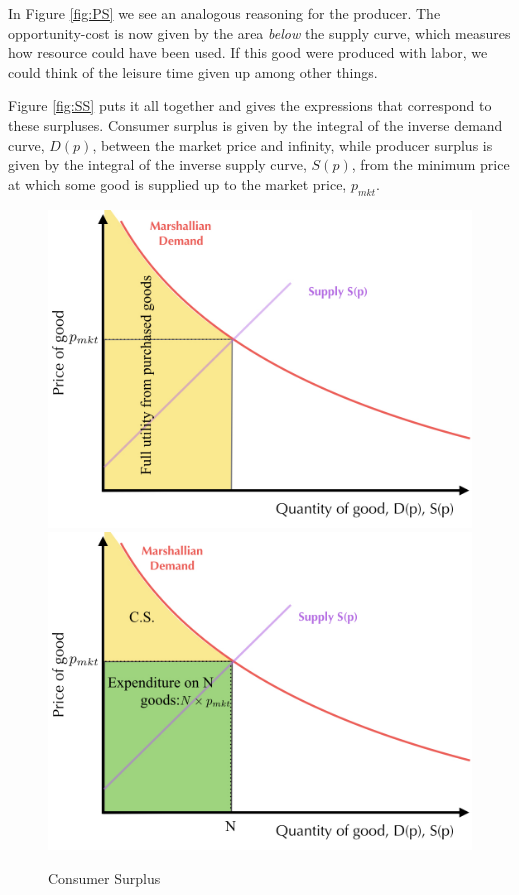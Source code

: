 \documentclass[11pt,english]{article}
\begin{document}
In Figure \ref{fig:PS} we see an analogous reasoning for the producer. The opportunity-cost is now given by the area \emph{below} the supply curve, which measures how resource could have been used. If this good were produced with labor, we could think of the leisure time given up among other things.

Figure \ref{fig:SS} puts it all together and gives the expressions that correspond to these surpluses. Consumer surplus is given by the integral of the inverse demand curve, $D(p)$, between the market price and infinity, while producer surplus is given by the integral of the inverse supply curve, $S(p)$, from the minimum price at which some good is supplied up to the market price, $p_{mkt}$.

\begin{figure}[htpb!]
	\centering
	\includegraphics[width=0.5\linewidth]{Figures/CS1}\includegraphics[width=0.5\linewidth]{Figures/CS2}
	\caption{Consumer Surplus}
	\label{fig:CS}
\end{figure}
\end{document}
